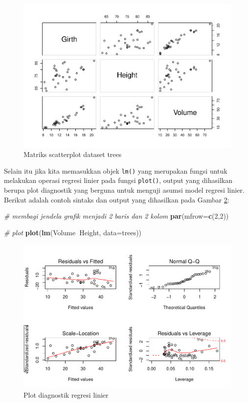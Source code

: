 \documentclass[]{book}
\newenvironment{Shaded}{\begin{snugshade}}{\end{snugshade}}
\newcommand{\KeywordTok}[1]{\textcolor[rgb]{0.13,0.29,0.53}{\textbf{#1}}}
\newcommand{\DataTypeTok}[1]{\textcolor[rgb]{0.13,0.29,0.53}{#1}}
\newcommand{\DecValTok}[1]{\textcolor[rgb]{0.00,0.00,0.81}{#1}}
\newcommand{\CommentTok}[1]{\textcolor[rgb]{0.56,0.35,0.01}{\textit{#1}}}
\newcommand{\OperatorTok}[1]{\textcolor[rgb]{0.81,0.36,0.00}{\textbf{#1}}}
\newcommand{\NormalTok}[1]{#1}
\begin{document}
\begin{figure}

{\centering \includegraphics[width=0.8\linewidth]{EnvStat_files/figure-latex/scatter2-1} 

}

\caption{Matriks scatterplot dataset trees}\label{fig:scatter2}
\end{figure}

Selain itu jika kita memasukkan objek \texttt{lm()} yang merupakan
fungsi untuk melakukan operasi regresi linier pada fungsi
\texttt{plot()}, output yang dihasilkan berupa plot diagnostik yang
berguna untuk menguji asumsi model regresi linier. Berikut adalah contoh
sintaks dan output yang dihasilkan pada Gambar \ref{fig:diag}:

\begin{Shaded}
\begin{Highlighting}[]
\CommentTok{# membagi jendela grafik menjadi 2 baris dan 2 kolom}
\KeywordTok{par}\NormalTok{(}\DataTypeTok{mfrow=}\KeywordTok{c}\NormalTok{(}\DecValTok{2}\NormalTok{,}\DecValTok{2}\NormalTok{))}

\CommentTok{# plot}
\KeywordTok{plot}\NormalTok{(}\KeywordTok{lm}\NormalTok{(Volume}\OperatorTok{~}\NormalTok{Height, }\DataTypeTok{data=}\NormalTok{trees))}
\end{Highlighting}
\end{Shaded}

\begin{figure}

{\centering \includegraphics[width=0.8\linewidth]{EnvStat_files/figure-latex/diag-1} 

}

\caption{Plot diagnostik regresi linier}\label{fig:diag}
\end{figure}
\end{document}
